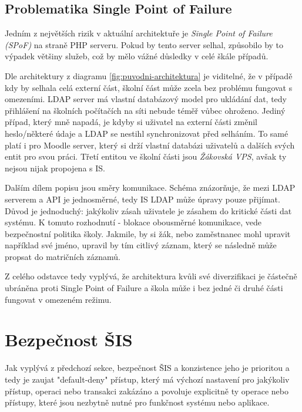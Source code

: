 \documentclass[FM,Proj]{tulthesis}
\begin{document}
\subsection*{Problematika Single Point of Failure}
\label{section:problematika-single-point-of-failure}

Jedním z největších rizik v aktuální architektuře je \textit{Single Point of Failure (SPoF)} na straně PHP serveru. 
Pokud by tento server selhal, způsobilo by to výpadek většiny služeb, což by mělo vážné důsledky v celé škále případů. 

Dle architektury z diagramu \ref{fig:puvodni-architektura} je viditelné, že v případě kdy by selhala celá externí část,
školní část může zcela bez problému fungovat s omezeními. LDAP server má vlastní databázový model pro ukládání dat, tedy
přihlášení na školních počítačích na síti nebude téměř vůbec ohroženo. Jediný případ, který mně napadá, je kdyby si uživatel
na externí části změnil heslo/některé údaje a LDAP se nestihl synchronizovat před selháním. To samé platí i pro Moodle
server, který si drží vlastní databázi uživatelů a dalších svých entit pro svou práci.
Třetí entitou ve školní části jsou \textit{Žákovská VPS}, avšak ty nejsou nijak propojena s IS.

Dalším dílem popisu jsou směry komunikace. Schéma znázorňuje, že mezi LDAP serverem a API je jednosměrné, tedy IS
LDAP může úpravy pouze přijímat. Důvod je jednoduchý: jakýkoliv zásah uživatele je zásahem do kritické části 
dat systému. K tomuto rozhodnutí - blokace obousměrné komunikace, vede bezpečnostní politika školy. Jakmile,
by si žák, nebo zaměstnanec mohl upravit například své jméno, upravil by tím citlivý záznam, který se následně
může propsat do matričních záznamů.

Z celého odstavce tedy vyplývá, že architektura kvůli své diverzifikaci je částečně ubráněna proti Single Point of Failure
a škola může i bez jedné či druhé části fungovat v omezeném režimu.

\section{Bezpečnost ŠIS}
\label{section:bezpecnost-sis}
Jak vyplývá z předchozí sekce, bezpečnost ŠIS a konzistence jeho je prioritou a tedy je
zaujat "default-deny" přístup, který má výchozí nastavení pro jakýkoliv přístup, operaci
nebo transakci zakázáno a povoluje explicitně ty operace nebo přístupy, které jsou
nezbytně nutné pro funkčnost systému nebo aplikace.
\end{document}
